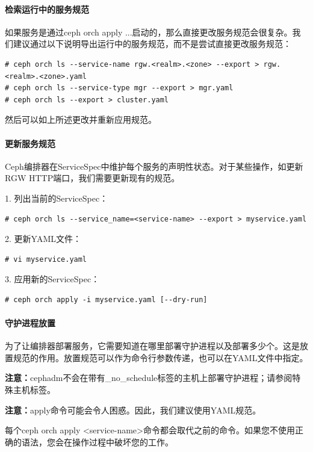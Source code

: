 \documentclass[12pt,UTF8]{ctexbook}
\begin{document}
\paragraph{检索运行中的服务规范}

如果服务是通过ceph orch apply ...启动的，那么直接更改服务规范会很复杂。我们建议通过以下说明导出运行中的服务规范，而不是尝试直接更改服务规范：
\begin{verbatim}
# ceph orch ls --service-name rgw.<realm>.<zone> --export > rgw.<realm>.<zone>.yaml
# ceph orch ls --service-type mgr --export > mgr.yaml
# ceph orch ls --export > cluster.yaml
\end{verbatim}

然后可以如上所述更改并重新应用规范。

\paragraph{更新服务规范}

Ceph编排器在ServiceSpec中维护每个服务的声明性状态。对于某些操作，如更新RGW HTTP端口，我们需要更新现有的规范。

1. 列出当前的ServiceSpec：
\begin{verbatim}
# ceph orch ls --service_name=<service-name> --export > myservice.yaml
\end{verbatim}

2. 更新YAML文件：
\begin{verbatim}
# vi myservice.yaml
\end{verbatim}

3. 应用新的ServiceSpec：
\begin{verbatim}
# ceph orch apply -i myservice.yaml [--dry-run]
\end{verbatim}

\paragraph{守护进程放置}

为了让编排器部署服务，它需要知道在哪里部署守护进程以及部署多少个。这是放置规范的作用。放置规范可以作为命令行参数传递，也可以在YAML文件中指定。

\textbf{注意：}cephadm不会在带有_no_schedule标签的主机上部署守护进程；请参阅特殊主机标签。

\textbf{注意：}apply命令可能会令人困惑。因此，我们建议使用YAML规范。

每个ceph orch apply <service-name>命令都会取代之前的命令。如果您不使用正确的语法，您会在操作过程中破坏您的工作。
\end{document}

